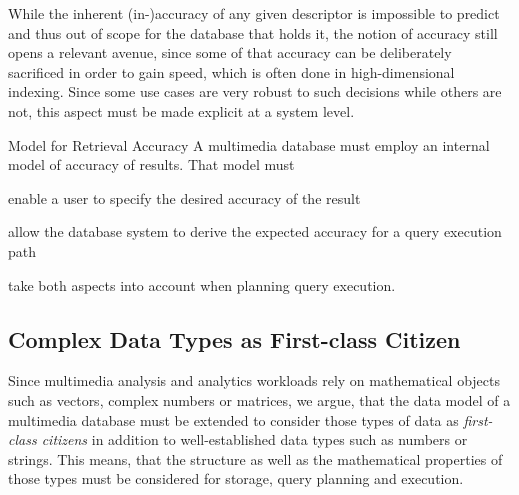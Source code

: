 While the inherent (in-)accuracy of any given descriptor is impossible to predict and thus out of scope for the database that holds it, the notion of accuracy still opens a relevant avenue, since some of that accuracy can be deliberately sacrificed in order to gain speed, which is often done in high-dimensional indexing. Since some use cases are very robust to such decisions while others are not, this aspect must be made explicit at a system level.

\begin{requirement}[label=requirement:accuracy_model]{Model for Retrieval Accuracy}{}
    A multimedia database must employ an internal model of accuracy of results. That model must
    \begin{enumerate*}[label=(\roman*)]
        \item enable a user to specify the desired accuracy of the result
        \item allow the database system to derive the expected accuracy for a query execution path
        \item take both aspects into account when planning query execution.
    \end{enumerate*}
\end{requirement}

\subsection{Complex Data Types as First-class Citizen}
Since multimedia analysis and analytics workloads rely on mathematical objects such as vectors, complex numbers or matrices, we argue, that the data model of a multimedia database must be extended to consider those types of data as \emph{first-class citizens} in addition to well-established data types such as numbers or strings. This means, that the structure as well as the mathematical properties of those types must be considered for storage, query planning and execution.

